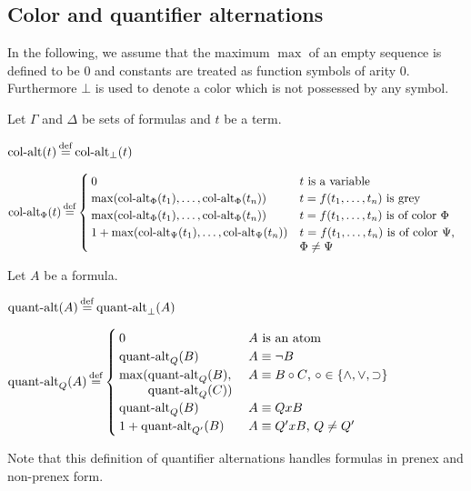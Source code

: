 \documentclass[%
	draft=false,%
	numbers=noendperiod,%
	11pt,%
	a4paper,%
	oneside,%
	openany,%
]{memoir}
\begin{document}
\subsection{Color and quantifier alternations}

In the following, we assume that the maximum $\max$ of an empty sequence is defined to be $0$ and constants are treated as function symbols of arity $0$.
Furthermore $\bot$ is used to denote a color which is not possessed by any symbol.
\begin{defi}
	Let $\Gamma$ and $\Delta$ be sets of formulas and $t$ be a term.

	\medskip

	\noindent
	$\ca(t) \defeq \ca_\bot(t)$
	\medskip

	\noindent
	$
	\ca_\Phi(t) \defeq 
	\begin{cases}
		0 & \text{$t$ is a variable} \\
		\max(\ca_\Phi(t_1), \dots, \ca_\Phi(t_n)) & \text{$t = f(t_1, \dots, t_n)$ is grey} \\
		\max(\ca_\Phi(t_1), \dots, \ca_\Phi(t_n)) & \parbox[t]{0.4\textwidth}{$t = f(t_1, \dots, t_n)$ is of color $\Phi$} \\
		1 + \max(\ca_\Psi(t_1), \dots, \ca_\Psi(t_n)) & \parbox[t]{0.38\textwidth}{$t = f(t_1, \dots, t_n)$ is of color $\Psi$, $\Phi \neq \Psi$} \\
	\end{cases}
	$
\end{defi}


\begin{defi}
	Let $A$ be a formula.\nopagebreak
	\medskip

	\noindent
	$\qa(A) \defeq \qa_\bot(A)$
	\nopagebreak
	\medskip

	\noindent
	$
	\qa_Q(A) \defeq 
	\begin{cases}
		0 & \text{$A$ is an atom} \\
		\qa_Q(B) & \text{$A \equiv \lnot B$} \\
		\max(\parbox[t]{0.2\textwidth}{$\qa_Q(B),$\newline$ \qa_Q(C))$} & \text{$A \equiv B \circ C$, $\circ \in \{\land, \lor, \limpl\}$} \\
		\qa_Q(B) & \text{$A \equiv Q x B$} \\
		1+\qa_{Q'}(B) & \text{$A \equiv Q' x B$, $Q \neq Q'$}  \\
	\end{cases}
	$
	\nopagebreak

	\qedhere
\end{defi}
Note that this definition of quantifier alternations handles formulas in prenex and non-prenex form.
\end{document}
